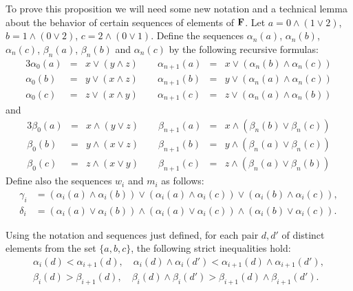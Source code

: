 To prove this proposition we will need some new notation and a technical lemma about the behavior of 
certain sequences of elements of $\mathbf{F}$.
    Let $a = 0 \wedge (1 \vee 2)$, $b = 1 \wedge (0 \vee 2)$, $c = 2 \wedge (0 \vee 1)$.
    Define the sequences $\alpha_n(a)$, $\alpha_n(b)$, $\alpha_n(c)$,
    $\beta_n(a)$, $\beta_n(b)$ and $\alpha_n(c)$ by the following recursive formulas:
\begin{alignat*}{3}
  \alpha_0(a) &=& x \vee (y \wedge z) \qquad \alpha_{n+1}(a)   &= &x \vee (\alpha_n(b) \wedge \alpha_n(c))\\
  \alpha_0(b) &=& y \vee (x \wedge z)\qquad \alpha_{n+1}(b)   &= &y \vee (\alpha_n(a) \wedge \alpha_n(c))\\
  \alpha_0(c)   &=& z \vee (x \wedge y)\qquad  \alpha_{n+1}(c)   &= &z \vee (\alpha_n(a) \wedge \alpha_n(b))
\end{alignat*}
and 
\begin{alignat*}{3}
  \beta_0(a)   &= &x \wedge (y \vee z)  \qquad \beta_{n+1}(a)   &= &x \wedge (\beta_n(b) \vee \beta_n(c))\\
  \beta_0(b)   &= & y \wedge (x \vee z)  \qquad  \beta_{n+1}(b)   &=& y \wedge (\beta_n(a) \vee \beta_n(c))\\
  \beta_0(c)   &= &z \wedge (x \vee y) \qquad   \beta_{n+1}(c)   &=& z \wedge (\beta_n(a) \vee \beta_n(b))
\end{alignat*}
Define also the sequences $w_i$ and $m_i$ as follows:
\begin{align*}
  \gamma_i &= (\alpha_i(a) \wedge \alpha_i(b)) \vee (\alpha_i(a) \wedge \alpha_i(c))
  \vee (\alpha_i(b) \wedge \alpha_i(c)),\\
  \delta_i &= (\alpha_i(a) \vee \alpha_i(b)) \wedge (\alpha_i(a) \vee \alpha_i(c))
  \wedge (\alpha_i(b) \vee \alpha_i(c)).
\end{align*}


\begin{lemma}\label{claim:2.3} Using the notation and sequences just defined,
  for each pair $d, d'$ of distinct elements from the set $\{a, b, c\}$, 
  the following strict inequalities hold:
  \begin{gather*}
    \alpha_i (d) < \alpha_{i+1}(d), \quad 
    \alpha_i (d) \wedge \alpha_i(d') < \alpha_{i+1} (d) \wedge \alpha_{i+1}(d'),\\
    \beta_i (d) > \beta_{i+1}(d), \quad  \beta_i (d) \wedge \beta_i(d') > \beta_{i+1} (d) \wedge \beta_{i+1}(d').
    \end{gather*}
  \end{lemma}

